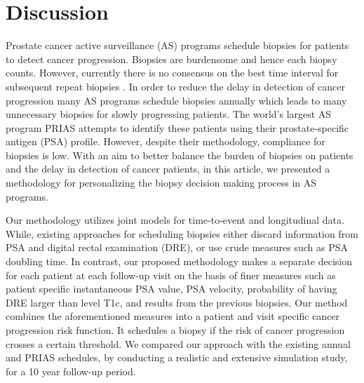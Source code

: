 
\section{Discussion}
\label{sec:discussion}
Prostate cancer active surveillance (AS) programs schedule biopsies for patients to detect cancer progression. Biopsies are burdensome and hence each biopsy counts. However, currently there is no consensus on the best time interval for subsequent repeat biopsies \cite{loeb2014heterogeneity}. In order to reduce the delay in detection of cancer progression many AS programs schedule biopsies annually which leads to many unnecessary biopsies for slowly progressing patients. The world's largest AS program PRIAS attempts to identify these patients using their prostate-specific antigen (PSA) profile. However, despite their methodology, compliance for biopsies is low. With an aim to better balance the burden of biopsies on patients and the delay in detection of cancer patients, in this article, we presented a methodology for personalizing the biopsy decision making process in AS programs.

Our methodology utilizes joint models for time‐to‐event and longitudinal data. While, existing approaches for scheduling biopsies either discard information from PSA and digital rectal examination (DRE), or use crude measures such as PSA doubling time. In contrast, our proposed methodology makes a separate decision for each patient at each follow-up visit on the basis of finer measures such as patient specific instantaneous PSA value, PSA velocity, probability of having DRE larger than level T1c, and results from the previous biopsies. Our method combines the aforementioned measures into a patient and visit specific cancer progression risk function. It schedules a biopsy if the risk of cancer progression crosses a certain threshold. We compared our approach with the existing annual and PRIAS schedules, by conducting a realistic and extensive simulation study, for a 10 year follow-up period.

